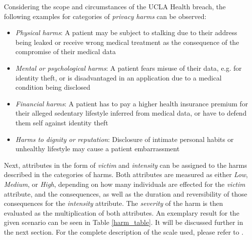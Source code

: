 Considering the scope and circumstances of the UCLA Health breach, the following examples for categories of \textit{privacy harms} can be observed:
\begin{itemize}
	\item \textit{Physical harms}: A patient may be subject to stalking due to their address being leaked or receive wrong medical treatment as the consequence of the compromise of their medical data
	\item \textit{Mental or psychological harms}: A patient fears misuse of their data, e.g. for identity theft, or is disadvantaged in an application due to a medical condition being disclosed
	\item \textit{Financial harms}: A patient has to pay a higher health insurance premium for their alleged sedentary lifestyle inferred from medical data, or have to defend them self against identity theft
	\item \textit{Harms to dignity or reputation}: Disclosure of intimate personal habits or unhealthy lifestyle may cause a patient embarrassment
\end{itemize}
Next, attributes in the form of \textit{victim} and \textit{intensity} can be assigned to the harms described in the categories of harms. Both attributes are measured as either \textit{Low}, \textit{Medium}, or \textit{High}, depending on how many individuals are effected for the \textit{victim} attribute, and the consequences, as well as the duration and reversibility of those consequences for the \textit{intensity} attribute. The \textit{severity} of the harm is then evaluated as the multiplication of both attributes. An exemplary result for the given scenario can be seen in Table \ref{harm_table}. It will be discussed further in the next section. For the complete description of the scale used, please refer to \cite[Section 3.7.1]{de:hal-01302541}.

\begin{table}[h!]
    \centering
\noindent{}
    \caption{Examples of harms of the UCLA Health breach and their attributes}
    \label{harm_table}    

\end{table}

